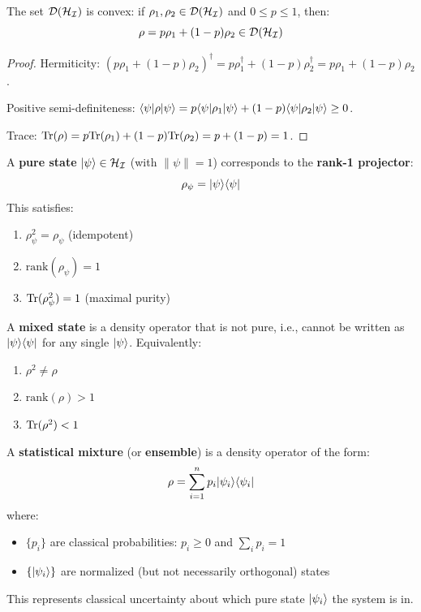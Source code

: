 \begin{proposition}
\label{prop:density-convex}
The set $\mathcal{D}(\mathcal{H}_{\mathcal{I}})$ is convex: if $\rho_1, \rho_2 \in \mathcal{D}(\mathcal{H}_{\mathcal{I}})$ and $0 \leq p \leq 1$, then:
\[
\rho = p \rho_1 + (1-p) \rho_2 \in \mathcal{D}(\mathcal{H}_{\mathcal{I}})
\]
\end{proposition}

\begin{proof}
Hermiticity: $(p\rho_1 + (1-p)\rho_2)^\dagger = p\rho_1^\dagger + (1-p)\rho_2^\dagger = p\rho_1 + (1-p)\rho_2$.

Positive semi-definiteness: $\langle \psi|\rho|\psi\rangle = p\langle \psi|\rho_1|\psi\rangle + (1-p)\langle \psi|\rho_2|\psi\rangle \geq 0$.

Trace: $\mathrm{Tr}(\rho) = p\mathrm{Tr}(\rho_1) + (1-p)\mathrm{Tr}(\rho_2) = p + (1-p) = 1$.
\end{proof}

\begin{definition}
\label{def:pure-state-density}
A \textbf{pure state} $|\psi\rangle \in \mathcal{H}_{\mathcal{I}}$ (with $\|\psi\| = 1$) corresponds to the \textbf{rank-1 projector}:
\[
\rho_\psi = |\psi\rangle\langle \psi|
\]
This satisfies:
\begin{enumerate}
  \item $\rho_\psi^2 = \rho_\psi$ (idempotent)
  \item $\mathrm{rank}(\rho_\psi) = 1$
  \item $\mathrm{Tr}(\rho_\psi^2) = 1$ (maximal purity)
\end{enumerate}
\end{definition}

\begin{definition}
\label{def:mixed-state}
A \textbf{mixed state} is a density operator that is not pure, i.e., cannot be written as $|\psi\rangle\langle \psi|$ for any single $|\psi\rangle$. Equivalently:
\begin{enumerate}
  \item $\rho^2 \neq \rho$
  \item $\mathrm{rank}(\rho) > 1$
  \item $\mathrm{Tr}(\rho^2) < 1$
\end{enumerate}
\end{definition}

\begin{definition}
\label{def:statistical-mixture}
A \textbf{statistical mixture} (or \textbf{ensemble}) is a density operator of the form:
\[
\rho = \sum_{i=1}^{n} p_i |\psi_i\rangle\langle \psi_i|
\]
where:
\begin{itemize}
  \item $\{p_i\}$ are classical probabilities: $p_i \geq 0$ and $\sum_i p_i = 1$
  \item $\{|\psi_i\rangle\}$ are normalized (but not necessarily orthogonal) states
\end{itemize}
This represents classical uncertainty about which pure state $|\psi_i\rangle$ the system is in.
\end{definition}

